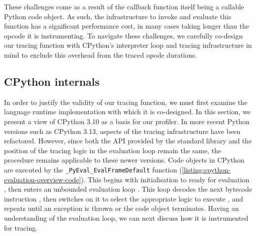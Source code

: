 These challenges come as a result of the callback function itself being a callable Python code object.
As such, the infrastructure to invoke and evaluate this function has a significant performance cost, in many cases taking longer than the opcode it is instrumenting.
To navigate these challenges, we carefully co-design our tracing function with CPython's interpreter loop and tracing infrastructure in mind to exclude this overhead from the traced opode durations.


\subsection{CPython internals}
\label{ssec:profiling-bytecode-cpython-internals}

In order to justify the validity of our tracing function, we must first examine the language runtime implementation with which it is co-designed. In this section, we present a view of CPython 3.10 as a basis for our profiler.
In more recent Python versions such as CPython 3.13, aspects of the tracing infrastructure have been refactored. However, since both the API provided by the standard library and the position of the tracing logic in the evaluation loop remain the same, the procedure remains applicable to these newer versions.
Code objects in CPython are executed by the \texttt{\_PyEval\_EvalFrameDefault} function (\autoref{listing:cpython-evaluation-overview-code}). This begins with initialisation to ready for evaluation , then enters an unbounded evaluation loop . This loop decodes the next bytecode instruction , then switches on it to select the appropriate logic to execute , and repeats until an exception is thrown or the code object terminates.
Having an understanding of the evaluation loop, we can next discuss how it is instrumented for tracing.


